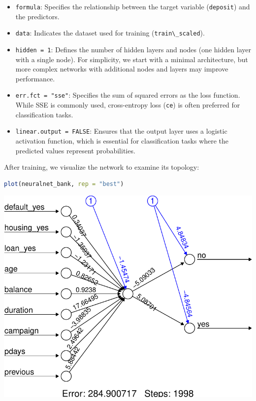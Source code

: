 \documentclass[
]{book}
\newcommand{\passthrough}[1]{#1}
\providecommand{\tightlist}{%
  \setlength{\itemsep}{0pt}\setlength{\parskip}{0pt}}
\theoremstyle{definition}
\theoremstyle{definition}
\theoremstyle{definition}
\theoremstyle{definition}
\theoremstyle{remark}
\begin{document}
\begin{itemize}
\tightlist
\item
  \passthrough{\lstinline!formula!}: Specifies the relationship between the target variable (\passthrough{\lstinline!deposit!}) and the predictors.\\
\item
  \passthrough{\lstinline!data!}: Indicates the dataset used for training (\passthrough{\lstinline!train\_scaled!}).\\
\item
  \passthrough{\lstinline!hidden = 1!}: Defines the number of hidden layers and nodes (one hidden layer with a single node). For simplicity, we start with a minimal architecture, but more complex networks with additional nodes and layers may improve performance.\\
\item
  \passthrough{\lstinline!err.fct = "sse"!}: Specifies the sum of squared errors as the loss function. While SSE is commonly used, cross-entropy loss (\passthrough{\lstinline!ce!}) is often preferred for classification tasks.\\
\item
  \passthrough{\lstinline!linear.output = FALSE!}: Ensures that the output layer uses a logistic activation function, which is essential for classification tasks where the predicted values represent probabilities.
\end{itemize}

After training, we visualize the network to examine its topology:

\begin{lstlisting}[language=R]
plot(neuralnet_bank, rep = "best")
\end{lstlisting}

\begin{center}\includegraphics[width=0.7\linewidth]{nn_files/figure-latex/unnamed-chunk-10-1} \end{center}
\end{document}

